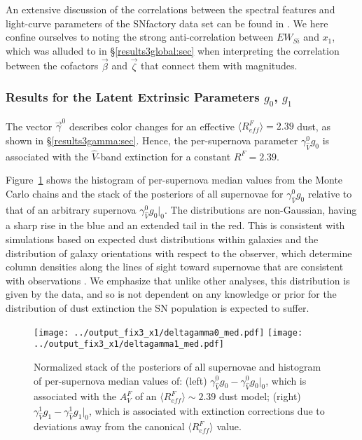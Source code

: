 \documentclass[trackchanges]{aastex61}   	%
\begin{document}
{An extensive discussion of the correlations between the spectral features  and light-curve parameters of the SNfactory data
set can be found in \citet{chotard:thesis, leget:thesis, 2017Chotard}. 
We here confine ourselves to noting the strong anti-correlation between $EW_{Si}$ and $x_1$, which was alluded
to in \S\ref{results3global:sec} when interpreting the correlation between the cofactors $\vec{\beta}$ and $\vec{\zeta}$ that connect them with magnitudes.

\subsubsection{Results for the Latent Extrinsic Parameters $g_0$, $g_1$}
\label{g0g1:sec}
The vector
$\vec{\gamma}^0$ describes color changes for an effective $\langle R^F_{\mathit{eff}}\rangle=2.39$ dust, as shown 
in  \S\ref{results3gamma:sec}.
Hence, the per-supernova parameter $\gamma^0_{\hat{V}} g_0$ is associated with the $\hat{V}$-band
extinction for a constant $R^F=2.39$.}
Figure~\ref{k0_med:fig} shows the histogram of
per-supernova
median values
from the Monte Carlo chains
and the  stack of the posteriors of all supernovae  for $\gamma^0_{\hat{V}} g_0$ 
relative to that of an arbitrary supernova  $\gamma^0_{\hat{V}} g_0|_0$.
The distributions are non-Gaussian, having a sharp rise in the blue and an extended tail in the red.  This is consistent
with
simulations based on expected dust distributions
within galaxies and the distribution of galaxy orientations with respect to the observer,
which determine column densities along the lines of sight toward supernovae that are consistent with observations
\citep{1998ApJ...502..177H, 2007ApJ...659..122J}.  
We emphasize that unlike other analyses,
this distribution is given by the data, and so is not dependent on any knowledge or prior
for the distribution of dust extinction the SN population is expected to suffer. 


\begin{figure}[htbp] %
   \centering
   \texttt{[image: ../output\_fix3\_x1/deltagamma0\_med.pdf]}
   \texttt{[image: ../output\_fix3\_x1/deltagamma1\_med.pdf]}
      \caption{
      Normalized stack of the posteriors of all supernovae  and histogram 
      of  per-supernova 
median values of: (left) $\gamma^0_{\hat{V}} g_0-\gamma^0_{\hat{V}} g_0|_0$, which is associated with the $A^F_V$ of an $\langle R^F_{\mathit{eff}}\rangle \sim 2.39$ dust model;
(right) $\gamma^1_{\hat{V}} g_1-\gamma^1_{\hat{V}} g_1|_0$,
which  is associated with extinction corrections due to deviations away from the canonical $\langle R^F_{\mathit{eff}}\rangle$ value.
   \label{k0_med:fig}}
\end{figure}
\end{document}
